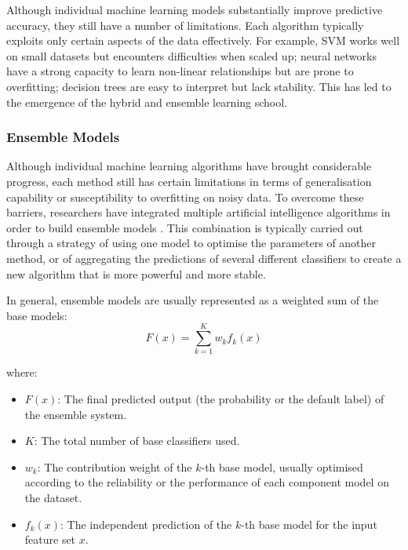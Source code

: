 Although individual machine learning models substantially improve predictive accuracy, they still have a number of limitations. Each algorithm typically exploits only certain aspects of the data effectively. For example, SVM works well on small datasets but encounters difficulties when scaled up; neural networks have a strong capacity to learn non-linear relationships but are prone to overfitting; decision trees are easy to interpret but lack stability. This has led to the emergence of the hybrid and ensemble learning school.


\subsubsection{Ensemble Models}
\noindent
Although individual machine learning algorithms have brought considerable progress, each method still has certain limitations in terms of generalisation capability or susceptibility to overfitting on noisy data. To overcome these barriers, researchers have integrated multiple artificial intelligence algorithms in order to build ensemble models \cite{liu2024credit}. This combination is typically carried out through a strategy of using one model to optimise the parameters of another method, or of aggregating the predictions of several different classifiers to create a new algorithm that is more powerful and more stable.

In general, ensemble models are usually represented as a weighted sum of the base models:
\begin{equation}
F(x) = \sum_{k=1}^{K} w_k f_k(x)
\end{equation}

\noindent where:
\begin{itemize}
    \item $F(x)$: The final predicted output (the probability or the default label) of the ensemble system.
    \item $K$: The total number of base classifiers used.
    \item $w_k$: The contribution weight of the $k$-th base model, usually optimised according to the reliability or the performance of each component model on the dataset.
    \item $f_k(x)$: The independent prediction of the $k$-th base model for the input feature set $x$.
\end{itemize}

